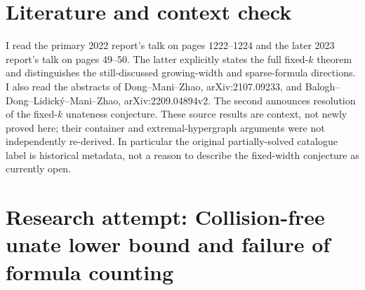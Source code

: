 \documentclass[11pt]{article}
\begin{document}
\section{Literature and context check}

I read the primary 2022 report's talk on pages 1222--1224 and the later 2023
report's talk on pages 49--50. The latter explicitly states the full fixed-$k$
theorem and distinguishes the still-discussed growing-width and sparse-formula
directions. I also read the abstracts of Dong--Mani--Zhao,
arXiv:2107.09233, and Balogh--Dong--Lidick\'y--Mani--Zhao,
arXiv:2209.04894v2. The second announces resolution of the fixed-$k$ unateness
conjecture. These source results are context, not newly proved here; their
container and extremal-hypergraph arguments were not independently re-derived.
In particular the original partially-solved catalogue label is historical metadata,
not a reason to describe the fixed-width conjecture as currently open.

\section{Research attempt: Collision-free unate lower bound and failure of formula counting}
\end{document}
